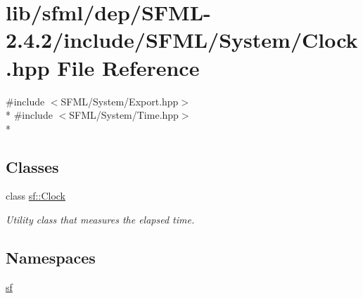 \hypertarget{sfml_2dep_2_s_f_m_l-2_84_82_2include_2_s_f_m_l_2_system_2_clock_8hpp}{\section{lib/sfml/dep/\-S\-F\-M\-L-\/2.4.2/include/\-S\-F\-M\-L/\-System/\-Clock.hpp File Reference}
\label{sfml_2dep_2_s_f_m_l-2_84_82_2include_2_s_f_m_l_2_system_2_clock_8hpp}
}
{\ttfamily \#include $<$S\-F\-M\-L/\-System/\-Export.\-hpp$>$}\\*
{\ttfamily \#include $<$S\-F\-M\-L/\-System/\-Time.\-hpp$>$}\\*
\subsection*{Classes}
\begin{DoxyCompactItemize}
\item 
class \hyperlink{classsf_1_1_clock}{sf\-::\-Clock}
\begin{DoxyCompactList}\small\item\em Utility class that measures the elapsed time. \end{DoxyCompactList}\end{DoxyCompactItemize}
\subsection*{Namespaces}
\begin{DoxyCompactItemize}
\item 
\hyperlink{namespacesf}{sf}
\end{DoxyCompactItemize}
